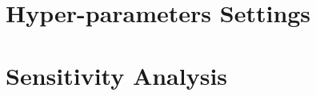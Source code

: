 \documentclass[../main.tex]{subfiles}
\begin{document}
\section{Hyper-parameters Settings}

\section{Sensitivity Analysis}
\end{document}
